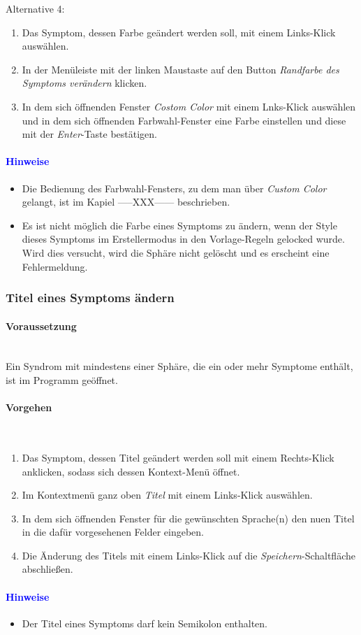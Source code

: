 \documentclass[enabledeprecatedfontcommands,fontsize=11pt,paper=a4,twoside]{scrartcl}
\newcommand*{\hint}{\paragraph{\textcolor{blue}{Hinweise}}}
\newcommand*{\condition}{\paragraph{Voraussetzung}$\;$ \vspace{0.2cm}\\}
\newcommand*{\actions}{\paragraph{Vorgehen} $\;$\vspace{0.2cm}\\}
\begin{document}
		Alternative 4:
			\begin{enumerate}
			\item Das Symptom, dessen Farbe geändert werden soll, mit einem Links-Klick auswählen.
			\item In der Menüleiste mit der linken Maustaste auf den Button \textit{Randfarbe des Symptoms verändern} klicken.
			\item In dem sich öffnenden Fenster \textit{Costom Color} mit einem Lnks-Klick auswählen und in dem sich öffnenden Farbwahl-Fenster eine Farbe einstellen und diese mit der \textit{Enter}-Taste bestätigen.
		\end{enumerate}
		\hint
		\begin{itemize}
			\item Die Bedienung des Farbwahl-Fensters, zu dem man über \textit{Custom Color} gelangt, ist im Kapiel -----XXX------ beschrieben.
			\item Es ist nicht möglich die Farbe eines Symptoms zu ändern, wenn der Style dieses Symptoms im Erstellermodus in den Vorlage-Regeln gelocked wurde. Wird dies versucht, wird die Sphäre nicht gelöscht und es erscheint eine Fehlermeldung.
	\end{itemize}	
	
					\newpage	
		\subsubsection{Titel eines Symptoms ändern}
		\condition 	
		Ein Syndrom mit mindestens einer Sphäre, die ein oder mehr Symptome enthält, ist im Programm geöffnet. 
		\actions  
		\begin{enumerate}
			\item Das Symptom, dessen Titel geändert werden soll mit einem Rechts-Klick anklicken, sodass sich dessen Kontext-Menü öffnet.
			\item Im Kontextmenü ganz oben \textit{Titel} mit einem Links-Klick auswählen. 
			\item In dem sich öffnenden Fenster für die gewünschten Sprache(n) den nuen Titel in die dafür vorgesehenen Felder eingeben.
			\item Die Änderung des Titels mit einem Links-Klick auf die \textit{Speichern}-Schaltfläche abschließen.
		\end{enumerate}
		\hint
		\begin{itemize}
			\item Der Titel eines Symptoms darf kein Semikolon enthalten.
		\end{itemize}
		
\end{document}
